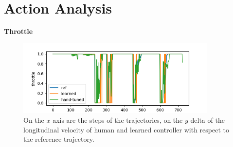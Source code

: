 \section{Action Analysis}

\textbf{Throttle}
\begin{figure}[H]
 \centering
  \captionsetup{width=10cm}
  \includegraphics[width=10cm]{./img/action_pois/throttle}
  \caption{On the $x$ axis are the steps of the trajectories, on the $y$ delta of the longitudinal velocity of human and learned controller with respect to the reference trajectory.}
   \label{fig:throttle}
\end{figure}

